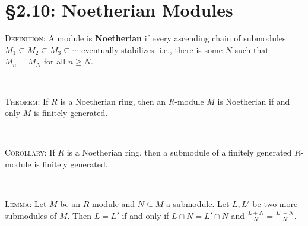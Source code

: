 \documentclass[12pt]{amsart}
\newcommand{\1}{\mathbbm{1}}
\newcommand{\showsol}[1]{\def\displaysol{#1}}
\begin{document}
\showsol{0}
	
	\thispagestyle{empty}
	
	\section*{\S2.10: Noetherian Modules}	

\begin{framed}

\noindent \textsc{Definition:} A module is \textbf{Noetherian} if every ascending chain of submodules $M_1 \subseteq M_2 \subseteq M_3 \subseteq \cdots$ eventually stabilizes: i.e., there is some $N$ such that $M_n=M_N$ for all $n\geq N$.

\

\noindent \textsc{Theorem:} If $R$ is a Noetherian ring, then an $R$-module $M$ is Noetherian if and only $M$ is finitely generated.

\

\noindent \textsc{Corollary:} If $R$ is a Noetherian ring, then a submodule of a finitely generated $R$-module is finitely generated.


\

\noindent \textsc{Lemma:} Let $M$ be an $R$-module and $N\subseteq M$ a submodule. Let $L,L'$ be two more submodules of $M$. Then $L=L'$ if and only if $L\cap N= L'\cap N$ and $\frac{L+N}{N}=\frac{L'+N}{N}$.

 \end{framed}
 
\end{document}
